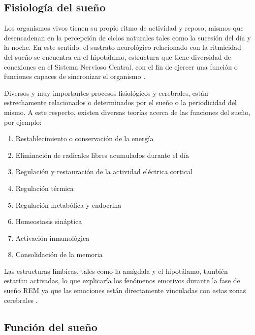 
\subsection{Fisiolog\'ia del sueño}

Los organismos vivos tienen su propio ritmo de actividad y reposo, mismos que desencadenan en la 
percepci\'on de ciclos naturales tales como la sucesión del d\'ia y la noche. En este sentido, 
el sustrato neurol\'ogico relacionado con la ritmicidad del sueño se encuentra en el hipot\'alamo, 
estructura que tiene diversidad de conexiones en el Sistema Nervioso Central, con el fin de 
ejercer una funci\'on o funciones capaces de sincronizar el organismo 
\cite{FernandezConde07,Cabrera14}.

Diversos y muy importantes procesos fisiol\'ogicos y cerebrales, est\'an estrechamente 
relacionados o determinados por el sue\~no o la periodicidad del mismo. A este respecto, existen 
diversas teor\'ias acerca de las funciones del sue\~no, por ejemplo: 
\begin{enumerate}
\item Restablecimiento o conservaci\'on de la energ\'ia
\item Eliminaci\'on de radicales libres acumulados durante el d\'ia
\item Regulaci\'on y restauraci\'on de la actividad el\'ectrica cortical
\item Regulación t\'ermica
\item Regulación metabólica y endocrina
\item Homeostasis sin\'aptica
\item Activaci\'on inmunol\'ogica
\item Consolidaci\'on de la memoria
\end{enumerate}

Las estructuras l\'imbicas, tales como la am\'igdala y el hipot\'alamo, tambi\'en estar\'ian 
activadas, lo que explicar\'ia los fen\'omenos emotivos durante la fase de sue\~no REM ya que 
las emociones est\'an directamente vinculadas con estas zonas cerebrales \cite{Bonet08}.


\subsection{Funci\'on del sue\~no}

